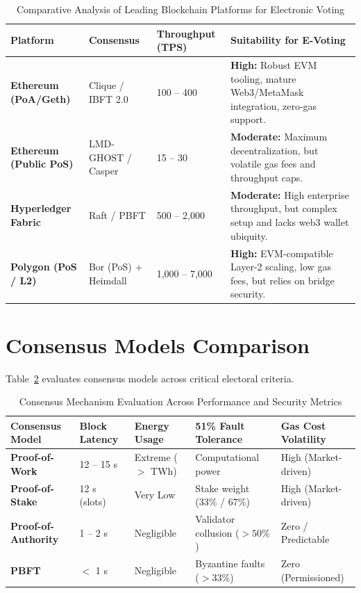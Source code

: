 \documentclass[12pt,a4paper]{report}
\begin{document}
\begin{table}[H]
\centering
\caption{Comparative Analysis of Leading Blockchain Platforms for Electronic Voting}
\label{tab:platform_comp}
\fontsize{8.5}{10.5}\selectfont
\begin{tabularx}{\textwidth}{p{3.2cm}p{3.0cm}p{3.0cm}X}
\toprule
\textbf{Platform} & \textbf{Consensus} & \textbf{Throughput (TPS)} & \textbf{Suitability for E-Voting} \\
\midrule
\textbf{Ethereum (PoA/Geth)} & Clique / IBFT 2.0 & 100 -- 400 & \textbf{High:} Robust EVM tooling, mature Web3/MetaMask integration, zero-gas support. \\
\textbf{Ethereum (Public PoS)} & LMD-GHOST / Casper & 15 -- 30 & \textbf{Moderate:} Maximum decentralization, but volatile gas fees and throughput caps. \\
\textbf{Hyperledger Fabric} & Raft / PBFT & 500 -- 2,000 & \textbf{Moderate:} High enterprise throughput, but complex setup and lacks web3 wallet ubiquity. \\
\textbf{Polygon (PoS / L2)} & Bor (PoS) + Heimdall & 1,000 -- 7,000 & \textbf{High:} EVM-compatible Layer-2 scaling, low gas fees, but relies on bridge security. \\
\bottomrule
\end{tabularx}
\end{table}

\clearpage
\section{Consensus Models Comparison}
Table~\ref{tab:consensus_comp} evaluates consensus models across critical electoral criteria.

\begin{table}[H]
\centering
\caption{Consensus Mechanism Evaluation Across Performance and Security Metrics}
\label{tab:consensus_comp}
\fontsize{8.5}{10.5}\selectfont
\begin{tabularx}{\textwidth}{p{3.0cm}p{2.5cm}p{2.5cm}p{2.5cm}X}
\toprule
\textbf{Consensus Model} & \textbf{Block Latency} & \textbf{Energy Usage} & \textbf{51\% Fault Tolerance} & \textbf{Gas Cost Volatility} \\
\midrule
\textbf{Proof-of-Work} & 12 -- 15 s & Extreme ($>$ TWh) & Computational power & High (Market-driven) \\
\textbf{Proof-of-Stake} & 12 s (slots) & Very Low & Stake weight (33\% / 67\%) & High (Market-driven) \\
\textbf{Proof-of-Authority} & 1 -- 2 s & Negligible & Validator collusion ($> 50\%$) & Zero / Predictable \\
\textbf{PBFT} & $<$ 1 s & Negligible & Byzantine faults ($> 33\%$) & Zero (Permissioned) \\
\bottomrule
\end{tabularx}
\end{table}
\end{document}
